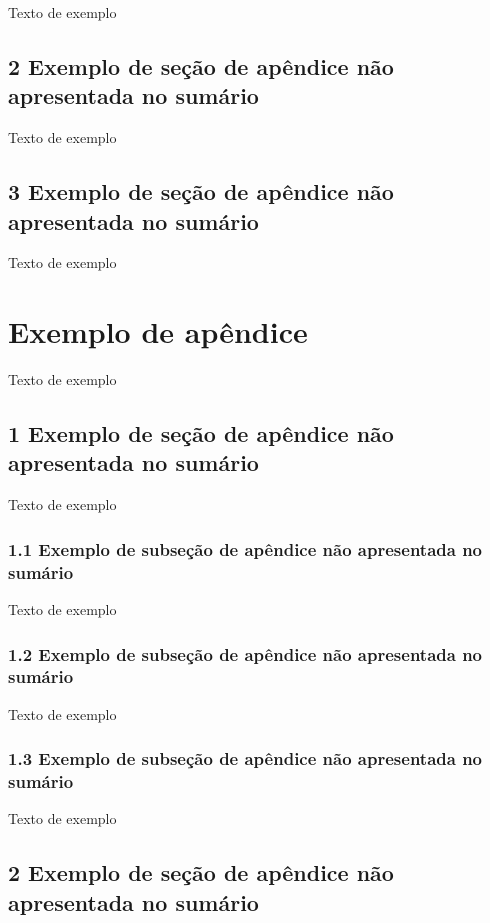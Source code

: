 \documentclass[
	12pt,				%
	oneside,			%
	a4paper,			%
	english,			%
	brazil				%
	]{abntex2ppgsi}
\begin{document}
\begin{apendicesenv}
Texto de exemplo

\section*{2 Exemplo de seção de apêndice não apresentada no sumário}

Texto de exemplo

\section*{3 Exemplo de seção de apêndice não apresentada no sumário}

Texto de exemplo


\chapter{Exemplo de apêndice}

Texto de exemplo

\section*{1 Exemplo de seção de apêndice não apresentada no sumário}

Texto de exemplo

\subsection*{1.1 Exemplo de subseção de apêndice não apresentada no sumário}

Texto de exemplo

\subsection*{1.2 Exemplo de subseção de apêndice não apresentada no sumário}

Texto de exemplo

\subsection*{1.3 Exemplo de subseção de apêndice não apresentada no sumário}

Texto de exemplo

\section*{2 Exemplo de seção de apêndice não apresentada no sumário}


\end{apendicesenv}
\end{document}
